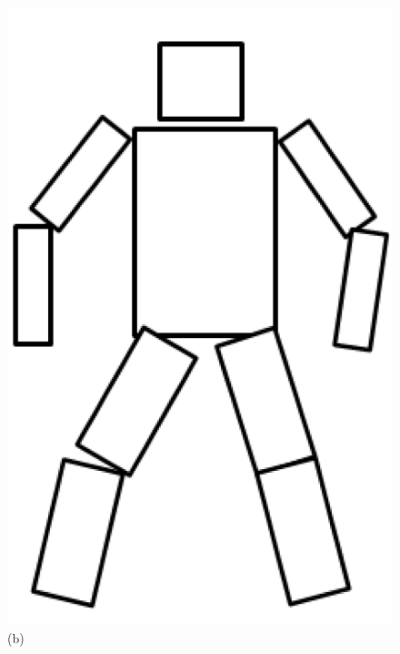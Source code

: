 \begin{figure}[!ht]
\begin{minipage}{.33\textwidth}
       \includegraphics[width=\linewidth]{figure/ch2_fig_personal_volumetric_model.png}
       \caption*{(b)}
    \end{minipage}%
    \begin{minipage}{.33\textwidth}
      \centering

\end{minipage}
\end{figure}
